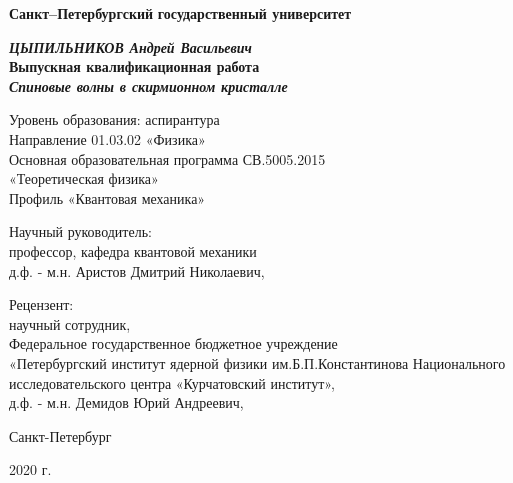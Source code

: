 
\begin{titlepage}
\begin{center}
\textbf{Санкт--Петербургский}
\textbf{государственный университет}

\vspace{35mm}

\textbf{\textit{\large ЦЫПИЛЬНИКОВ Андрей Васильевич}} \\[8mm]
\textbf{\large Выпускная квалификационная работа}\\[3mm]
\textbf{\textit{\large Спиновые волны в
скирмионном кристалле}}

\vspace{20mm}
Уровень образования: аспирантура\\
Направление 01.03.02 «Физика»\\
Основная образовательная программа СВ.5005.2015 \\
«Теоретическая физика»\\
Профиль «Квантовая механика»\\[30mm]


\begin{flushright}
{Научный руководитель:} \\
профессор, кафедра квантовой механики \\ д.ф. - м.н.  Аристов Дмитрий
Николаевич,
\end{flushright}
\begin{flushright}
{Рецензент:} \\
научный сотрудник, \\
Федеральное государственное бюджетное учреждение \\ 
«Петербургский институт ядерной физики им.Б.П.Константинова Национального
исследовательского центра «Курчатовский институт», \\
д.ф. - м.н.  Демидов Юрий Андреевич,
\end{flushright}

\vfill 

{Санкт-Петербург}
\par{2020 г.}
\end{center}
\end{titlepage}
\restoregeometry
\addtocounter{page}{1}